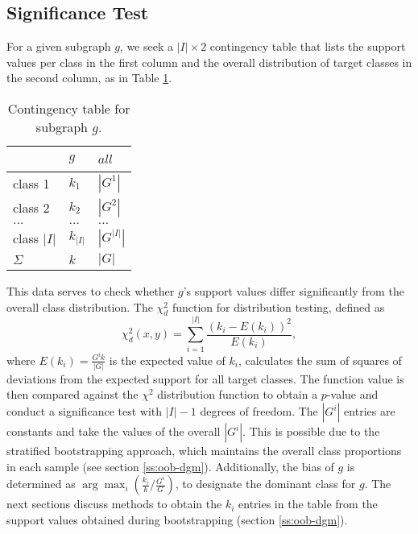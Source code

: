 \documentclass{sig-alternate}
\begin{document}
\subsection{Significance Test}
\label{ss:significance-test}
For a given subgraph $g$, we seek a $|I| \times 2$ contingency table that lists the
support values per class in the first column and the overall distribution of target
classes in the second column, as in Table \ref{t-ContingencyTableIndTest}.
\begin{table}[t]
  \centering
  \begin{tabular}{|l|l|l|}
    \hline
    ~           &	$g$       & $all$       \\\hline
    class 1	    &	$k_1$     & $|G^1|$     \\\hline
    class 2 	  &	$k_2$     & $|G^2|$     \\\hline
    $\ldots$ 	  &	$\ldots$  & $\ldots$    \\\hline
    class $|I|$	&	$k_{|I|}$ & $|G^{|I|}|$ \\\hline
    $\Sigma$	  &	$k$       & $|G|$       \\\hline
  \end{tabular}
  \caption[]{Contingency table for subgraph $g$.}
  \label{t-ContingencyTableIndTest}
\end{table}
This data serves to check whether $g$'s support values differ
significantly from the overall class distribution.  The $\chi^2_d$ function for
distribution testing, defined as
\begin{equation}
  \chi^2_d(x,y) = \sum_{i=1}^{|I|} \frac{(k_i-E(k_i))^2}{E(k_i)},
  \label{eq:chid}
\end{equation} 
where $E(k_i)=\frac{G^{i}k}{|G|}$ is the expected value of $k_i$, calculates
the sum of squares of deviations from the expected support for all target
classes. The function value is then compared against the $\chi^2$
distribution function to obtain a $p$-value and conduct a significance test with
$|I|-1$ degrees of freedom.  The $|G^{i}|$ entries are constants and take the values of
the overall $|G^{i}|$.  This is possible due to the stratified bootstrapping approach,
which maintains the overall class proportions in each sample (see section
\ref{ss:oob-dgm}). 
Additionally, the bias of $g$ is determined as $\arg\max_i (\frac{k_i}{k}/\frac{G^i}{G})$, to designate the dominant class for $g$.
The next sections discuss methods to obtain the
$k_i$ entries in the table from the support values obtained during bootstrapping (section
\ref{ss:oob-dgm}).  
\end{document}
